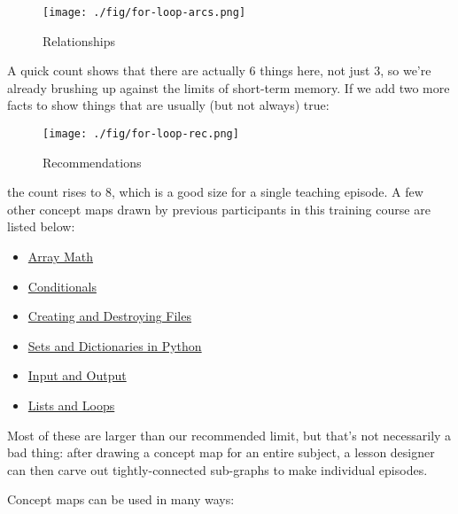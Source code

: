\begin{figure}
\begin{center}
\texttt{[image: ./fig/for-loop-arcs.png]}
\end{center}
\caption{Relationships}

\end{figure}

A quick count shows that there are actually 6 things here,
not just 3,
so we're already brushing up against the limits of short-term memory.
If we add two more facts to show things that are usually (but not always) true:

\begin{figure}
\begin{center}
\texttt{[image: ./fig/for-loop-rec.png]}
\end{center}
\caption{Recommendations}

\end{figure}

the count rises to 8,
which is a good size for a single teaching episode.
A few other concept maps drawn by previous participants in this training course
are listed below:

\begin{itemize}
\item \href{./fig/array-math.png}{Array Math}
\item \href{./fig/conditionals.png}{Conditionals}
\item \href{./fig/create-destroy.png}{Creating and Destroying Files}
\item \href{./fig/dict-set.png}{Sets and Dictionaries in Python}
\item \href{./fig/io.png}{Input and Output}
\item \href{./fig/lists-loops.png}{Lists and Loops}
\end{itemize}

Most of these are larger than our recommended limit,
but that's not necessarily a bad thing:
after drawing a concept map for an entire subject,
a lesson designer can then carve out tightly-connected sub-graphs to make individual episodes.

Concept maps can be used in many ways:

